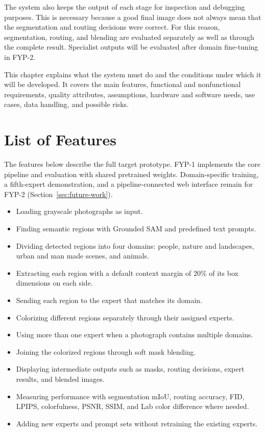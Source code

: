 \documentclass{FastFyp}
\begin{document}
The system also keeps the output of each stage for inspection and debugging purposes. This is necessary because a good final image does not always mean that the segmentation and routing decisions were correct. For this reason, segmentation, routing, and blending are evaluated separately as well as through the complete result. Specialist outputs will be evaluated after domain fine-tuning in FYP-2.

This chapter explains what the system must do and the conditions under which it will be developed. It covers the main features, functional and nonfunctional requirements, quality attributes, assumptions, hardware and software needs, use cases, data handling, and possible risks.

\section{List of Features}

The features below describe the full target prototype. FYP-1 implements the core pipeline and evaluation with shared pretrained weights. Domain-specific training, a fifth-expert demonstration, and a pipeline-connected web interface remain for FYP-2 (Section~\ref{sec:future-work}).

\begin{itemize}
    \item Loading grayscale photographs as input.
    
    \item Finding semantic regions with Grounded SAM and predefined text prompts.
    
    \item Dividing detected regions into four domains: people, nature and landscapes, urban and man made scenes, and animals.
    
    \item Extracting each region with a default context margin of 20\% of its box dimensions on each side.
    
    \item Sending each region to the expert that matches its domain.
    
    \item Colorizing different regions separately through their assigned experts.
    
    \item Using more than one expert when a photograph contains multiple domains.
    
    \item Joining the colorized regions through soft mask blending.
    
    \item Displaying intermediate outputs such as masks, routing decisions, expert results, and blended images.
    
    \item Measuring performance with segmentation mIoU, routing accuracy, FID, LPIPS, colorfulness, PSNR, SSIM, and Lab color difference where needed.
    
    \item Adding new experts and prompt sets without retraining the existing experts.
\end{itemize}
\end{document}
